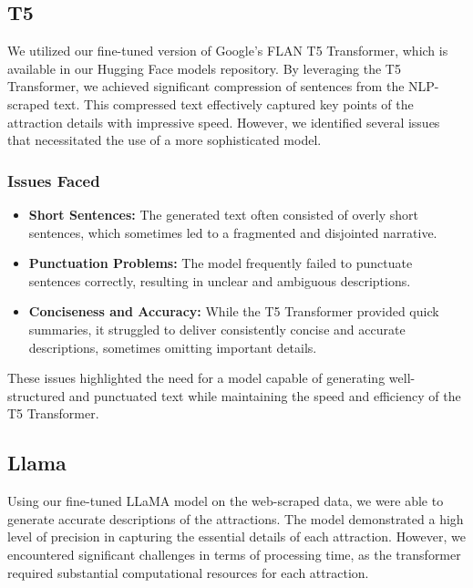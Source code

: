 \documentclass[conference]{IEEEtran}
\begin{document}
    \subsection{T5}
        
        We utilized our fine-tuned version of Google's FLAN T5 Transformer, which is available in our Hugging Face models repository. By leveraging the T5 Transformer, we achieved significant compression of sentences from the NLP-scraped text. This compressed text effectively captured key points of the attraction details with impressive speed. However, we identified several issues that necessitated the use of a more sophisticated model.
        
        \subsubsection{Issues Faced}
            \begin{itemize}
                \item \textbf{Short Sentences:} The generated text often consisted of overly short sentences, which sometimes led to a fragmented and disjointed narrative.
                \item \textbf{Punctuation Problems:} The model frequently failed to punctuate sentences correctly, resulting in unclear and ambiguous descriptions.
                \item \textbf{Conciseness and Accuracy:} While the T5 Transformer provided quick summaries, it struggled to deliver consistently concise and accurate descriptions, sometimes omitting important details.
            \end{itemize}

            These issues highlighted the need for a model capable of generating well-structured and punctuated text while maintaining the speed and efficiency of the T5 Transformer.
            
    \subsection{Llama}
        
        Using our fine-tuned LLaMA model on the web-scraped data, we were able to generate accurate descriptions of the attractions. The model demonstrated a high level of precision in capturing the essential details of each attraction. However, we encountered significant challenges in terms of processing time, as the transformer required substantial computational resources for each attraction.
        
\end{document}
